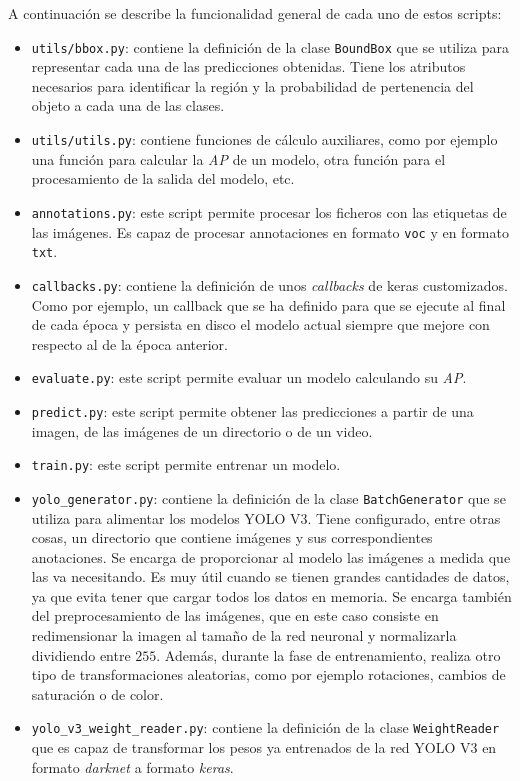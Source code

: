 A continuación se describe la funcionalidad general de cada uno de estos scripts:

\begin{itemize}
	\item \texttt{utils/bbox.py}: contiene la definición de la clase \texttt{BoundBox} que se utiliza para representar cada una de las predicciones obtenidas. Tiene los atributos necesarios para identificar la región y la probabilidad de pertenencia del objeto a cada una de las clases.
	\item \texttt{utils/utils.py}: contiene funciones de cálculo auxiliares, como por ejemplo una función para calcular la \textit{AP} de un modelo, otra función para el procesamiento de la salida del modelo, etc.
	\item \texttt{annotations.py}: este script permite procesar los ficheros con las etiquetas de las imágenes. Es capaz de procesar annotaciones en formato \texttt{voc} y en formato \texttt{txt}.
	\item \texttt{callbacks.py}: contiene la definición de unos \textit{callbacks} de keras customizados. Como por ejemplo, un callback que se ha definido para que se ejecute al final de cada época y persista en disco el modelo actual siempre que mejore con respecto al de la época anterior.
	\item \texttt{evaluate.py}: este script permite evaluar un modelo calculando su \textit{AP}.
	\item \texttt{predict.py}: este script permite obtener las predicciones a partir de una imagen, de las imágenes de un directorio o de un video.
	\item \texttt{train.py}: este script permite entrenar un modelo.
	\item \texttt{yolo\_generator.py}: contiene la definición de la clase \texttt{BatchGenerator} que se utiliza para alimentar los modelos YOLO V3. Tiene configurado, entre otras cosas, un directorio que contiene imágenes y sus correspondientes anotaciones. Se encarga de proporcionar al modelo las imágenes a medida que las va necesitando. Es muy útil cuando se tienen grandes cantidades de datos, ya que evita tener que cargar todos los datos en memoria. Se encarga también del preprocesamiento de las imágenes, que en este caso consiste en redimensionar la imagen al tamaño de la red neuronal y normalizarla dividiendo entre $255$. Además, durante la fase de entrenamiento, realiza otro tipo de transformaciones aleatorias, como por ejemplo rotaciones, cambios de saturación o de color.
	\item \texttt{yolo\_v3\_weight\_reader.py}: contiene la definición de la clase \texttt{WeightReader}  que es capaz de transformar los pesos ya entrenados de la red YOLO V3 en formato \textit{darknet} a formato \textit{keras}.

\end{itemize}
